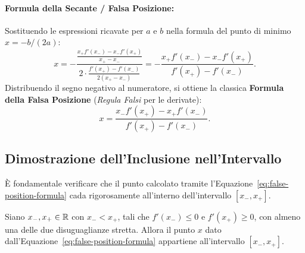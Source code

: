 \paragraph{Formula della Secante / Falsa Posizione:}
Sostituendo le espressioni ricavate per $a$ e $b$ nella formula del punto di minimo $x = -b / (2a)$:
\begin{equation}
    x = -\frac{\frac{x_+ f'(x_-) - x_- f'(x_+)}{x_+ - x_-}}{2 \cdot \frac{f'(x_+) - f'(x_-)}{2(x_+ - x_-)}} = -\frac{x_+ f'(x_-) - x_- f'(x_+)}{f'(x_+) - f'(x_-)}.
\end{equation}
Distribuendo il segno negativo al numeratore, si ottiene la classica \textbf{Formula della Falsa Posizione} (\textit{Regula Falsi} per le derivate):
\begin{equation}
    x = \frac{x_- f'(x_+) - x_+ f'(x_-)}{f'(x_+) - f'(x_-)}.
    \label{eq:false-position-formula}
\end{equation}

\subsection{Dimostrazione dell'Inclusione nell'Intervallo}
\`E fondamentale verificare che il punto calcolato tramite l'Equazione~\eqref{eq:false-position-formula} cada rigorosamente all'interno dell'intervallo $[x_-, x_+]$.

\begin{theorem}
Siano $x_-, x_+ \in \mathbb{R}$ con $x_- < x_+$, tali che $f'(x_-) \le 0$ e $f'(x_+) \ge 0$, con almeno una delle due disuguaglianze stretta. Allora il punto $x$ dato dall'Equazione~\eqref{eq:false-position-formula} appartiene all'intervallo $[x_-, x_+]$.
\end{theorem}

